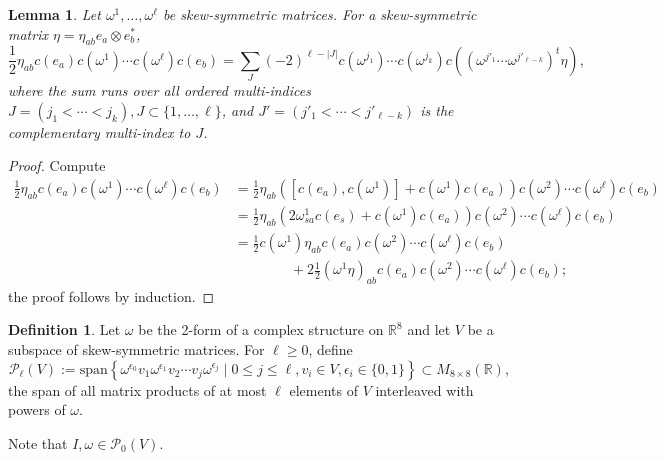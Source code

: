 \documentclass{article}
\newcommand{\real}{\mathbb{R}}
\newcommand{\vspan}{\mathrm{span}}
\newtheorem{lemma}[theorem]{Lemma}
\theoremstyle{definition}
\newtheorem{definition}[theorem]{Definition}
\theoremstyle{remark}
\begin{document}
\begin{lemma}
    \label{lem:innerchain}
    Let $\omega^1, \ldots, \omega^\ell$ be skew-symmetric matrices.
    For a skew-symmetric matrix $\eta = \eta_{ab} e_a \otimes e_b^*$,
    \[
        \frac{1}{2} \eta_{ab} c(e_a) c(\omega^1) \cdots c(\omega^\ell) c(e_b) = \sum_{J} (-2)^{\ell-|J|} c(\omega^{j_1}) \cdots c(\omega^{j_k}) c((\omega^{j'_1} \cdots \omega^{j'_{\ell-k}})^t \eta),
    \]
    where the sum runs over all ordered multi-indices $J = (j_1 < \cdots < j_k), J \subset \{1, \ldots, \ell\}$, and $J' = (j'_1 < \cdots < j'_{\ell-k})$ is the complementary multi-index to $J$.
\end{lemma}
\begin{proof}
    Compute
    \begin{align*}
        \frac{1}{2} \eta_{ab} c(e_a) c(\omega^1) \cdots c(\omega^\ell) c(e_b)  &= \frac{1}{2} \eta_{ab} ([c(e_a), c(\omega^1)] + c(\omega^1) c(e_a)) c(\omega^2) \cdots c(\omega^\ell) c(e_b) \\
                                                                               &= \frac{1}{2} \eta_{ab} (2\omega^1_{sa} c(e_s) + c(\omega^1) c(e_a)) c(\omega^2) \cdots c(\omega^\ell) c(e_b) \\
                                                                            &=  \frac{1}{2}c(\omega^1) \eta_{ab} c(e_a) c(\omega^2) \cdots c(\omega^\ell) c(e_b) \\
                                                                            &\qquad\qquad + 2 \frac{1}{2} (\omega^1 \eta)_{ab} c(e_a) c(\omega^2) \cdots c(\omega^\ell) c(e_b);
    \end{align*}
    the proof follows by induction.
\end{proof}

\begin{definition}
    \label{def:pl}
    Let $\omega$ be the 2-form of a complex structure on $\real^8$ and let $V$ be a subspace of skew-symmetric matrices.
    For $\ell \ge 0$, define
    \[
        \mathcal{P}_\ell(V) := \vspan \left\{ \omega^{\epsilon_0} v_1 \omega^{\epsilon_1} v_2 \cdots v_j \omega^{\epsilon_j} \mid 0 \le j \le \ell, v_i \in V, \epsilon_i \in \{0,1\} \right\} \subset M_{8\times 8}(\real),
    \]
    the span of all matrix products of at most $\ell$ elements of $V$ interleaved with powers of $\omega$. 
\end{definition}
Note that $I, \omega \in \mathcal{P}_0(V)$.
\end{document}
